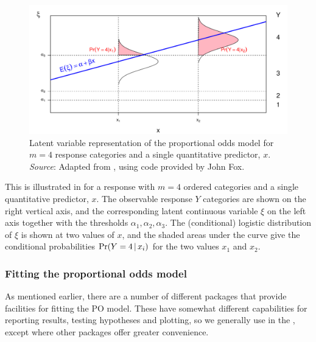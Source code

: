 \documentclass[11pt]{book}\usepackage[]{graphicx}\usepackage[]{color}
\begin{document}

\begin{figure}
 \centering
 \includegraphics[width=.9\textwidth]{ch07/fig/latent}
 \caption{Latent variable representation of the proportional odds model for $m=4$ response categories and a single quantitative predictor, $x$.
 \emph{Source}: Adapted from \citet[Fig 14.10]{Fox:2008}, using code provided by John Fox.}
 \label{fig:latent}
\end{figure}

This is illustrated in  for a response with $m=4$ 
ordered categories and a single quantitative predictor, $x$.  The observable
response $Y$ categories are shown on the right vertical axis, and the
corresponding latent continuous variable $\xi$ on the left axis
together with the thresholds $\alpha_1, \alpha_2, \alpha_3$.
The (conditional) logistic distribution of $\xi$ is shown at two values  
of $x$, and the shaded areas under the curve give the conditional probabilities
$\Pr (Y=4 \, | \, x_i)$ for the two values $x_1$ and $x_2$.


\subsubsection{Fitting the proportional odds model}

As mentioned earlier, there are a number of different \R packages that
provide facilities for fitting the PO model. These have somewhat different
capabilities for reporting results, testing hypotheses and plotting,
so we generally use  in the , except where
other packages offer greater convenience.
\end{document}
